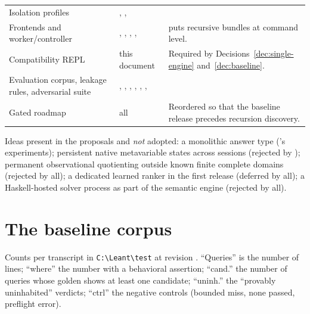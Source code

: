 {\begin{longtable}{@{}L{4.3cm}L{2.3cm}L{8.5cm}@{}}
Isolation profiles & , ,  & \\
Frontends and worker/controller & , , , ,  &  puts recursive bundles at command level. \\
Compatibility REPL & this document & Required by Decisions~\ref{dec:single-engine} and~\ref{dec:baseline}. \\
Evaluation corpus, leakage rules, adversarial suite & , , , , , ,  & \\
Gated roadmap & all & Reordered so that the baseline release precedes recursion discovery. \\
\bottomrule
\end{longtable}
}

Ideas present in the proposals and \emph{not} adopted: a monolithic  answer type ('s experiments); persistent native metavariable states across sessions (rejected by ); permanent observational quotienting outside known finite complete domains (rejected by all); a dedicated learned ranker in the first release (deferred by all); a Haskell-hosted solver process as part of the semantic engine (rejected by all).

\section{The baseline corpus}\label{app:corpus}

Counts per transcript in \texttt{C:\textbackslash Leant\textbackslash test} at revision . ``Queries'' is the number of  lines; ``where'' the number with a behavioral assertion; ``cand.'' the number of queries whose golden shows at least one candidate; ``uninh.'' the ``provably uninhabited'' verdicts; ``ctrl'' the negative controls (bounded miss, none passed, preflight error).

